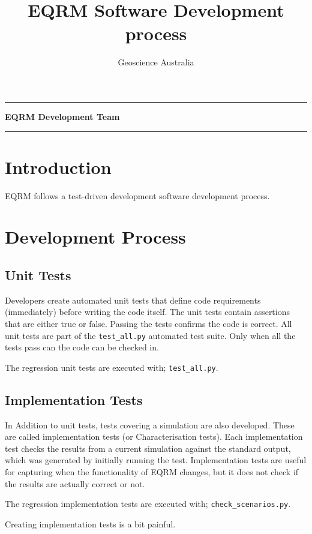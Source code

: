 \documentclass[a4paper, 12pt]{article}
\title{EQRM Software Development process}
\author{Geoscience Australia}
\makeatletter
\def\maketitle{%
\null
\thispagestyle{empty}%
\hrule height 0.5pt \vskip 2.5cm
\begin{center}
\normalfont
{\Large \textbf\@title\par}%
\vskip 2.5cm \normalsize \textbf{EQRM Development Team} \vskip 2.5cm
{\normalsize \textbf \@author\par}%
\vskip 4.53cm
{\normalsize \textbf \@date\par}%
\vskip 3.5cm \hrule height 0.5pt
\end{center}%
\null \clearpage }
\makeatother
\begin{document}
\maketitle

\section{Introduction}
EQRM follows a test-driven development software development process. 


\section{Development Process}

\subsection{Unit Tests}

Developers create automated unit tests that define code requirements
(immediately) before writing the code itself. The unit tests contain
assertions that are either true or false. Passing the tests confirms
the code is correct.  All unit tests are part of the \texttt{test\_all.py}
automated test suite.  Only when all the tests pass can the code can
be checked in.

The regression unit tests are executed with;
 \texttt{test\_all.py}.

\subsection{Implementation Tests}

In Addition to unit tests, tests covering a simulation are also
developed.  These are called implementation tests (or Characterisation
tests).  Each implementation test checks the results from a current
simulation against the standard output, which was generated by
initially running the test.  Implementation tests are useful for
capturing when the functionality of EQRM changes, but it does not
check if the results are actually correct or not.

The regression implementation tests are executed with;
 \texttt{check\_scenarios.py}.
 


Creating implementation tests is a bit painful.  
 
\end{document}
